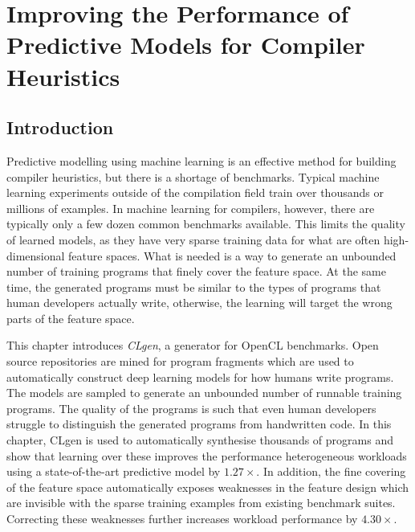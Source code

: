 \chapter{Improving the Performance of Predictive Models for Compiler Heuristics}
\label{chap:clgen}


\section{Introduction}

Predictive modelling using machine learning is an effective method for building compiler heuristics, but there is a shortage of benchmarks. Typical machine learning experiments outside of the compilation field train over thousands or millions of examples. In machine learning for compilers, however, there are typically only a few dozen common benchmarks available. This limits the quality of learned models, as they have very sparse training data for what are often high-dimensional feature spaces. What is needed is a way to generate an unbounded number of training programs that finely cover the feature space. At the same time, the generated programs must be similar to the types of programs that human developers actually write, otherwise, the learning will target the wrong parts of the feature space.

This chapter introduces \emph{CLgen}, a generator for OpenCL benchmarks. Open source repositories are mined for program fragments which are used to automatically construct deep learning models for how humans write programs. The models are sampled to generate an unbounded number of runnable training programs. The quality of the programs is such that even human developers struggle to distinguish the generated programs from handwritten code. In this chapter, CLgen is used to automatically synthesise thousands of programs and show that learning over these improves the performance heterogeneous workloads using a state-of-the-art predictive model by $1.27\times$. In addition, the fine covering of the feature space automatically exposes weaknesses in the feature design which are invisible with the sparse training examples from existing benchmark suites. Correcting these weaknesses further increases workload performance by $4.30\times$.


